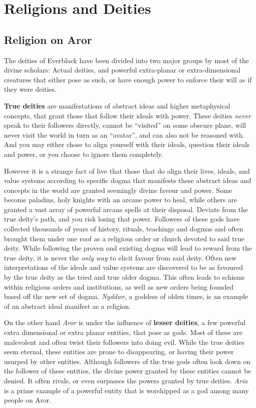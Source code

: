 \chapter{Religions and Deities}

\section{Religion on Aror}
\label{sec:Religion}

The deities of Everblack have been divided into two major groups by most of
the divine scholars: Actual deities, and powerful extra-planar or
extra-dimensional creatures that either pose as such, or have enough power to
enforce their will as if they were deities.

\textbf{True deities} are manifestations of abstract ideas and higher
metaphysical concepts, that grant those that follow their ideals with
power. These deities \emph{never} speak to their followers directly, cannot be
``visited'' on some obscure plane, will never visit the world in turn as an
``avatar'', and can also not be reasoned with. And you may either chose to
align yourself with their ideals, question their ideals and power, or you
choose to ignore them completely.

However it is a strange fact of live that those that do align their lives,
ideals, and value systems according to specific dogma that manifests these
abstract ideas and concepts in the world are granted seemingly divine favour
and power. Some become paladins, holy knights with an arcane power to heal,
while others are granted a vast array of powerful arcane spells at their
disposal. Deviate from the true deity's path, and you risk losing that
power. Followers of these gods have collected thousands of years of history,
rituals, teachings and dogmas and often brought them under one roof as a
religious order or church devoted to said true deity. While following the
proven and existing dogma will lead to reward from the true deity, it is never
the \emph{only way} to elicit favour from said deity. Often new
interpretations of the ideals and value systems are discovered to be as
favoured by the true deity as the tried and true older dogma. This often leads
to schisms within religious orders and institutions, as well as new orders
being founded based off the new set of dogma. \emph{Nyddwr}, a goddess of
olden times, is an example of an abstract ideal manifest as a religion.

On the other hand \emph{Aror} is under the influence of \textbf{lesser
  deities}, a few powerful extra dimensional or extra planar entities, that
pose as gods. Most of these are malevolent and often twist their followers
into doing evil. While the true deities seem eternal, these entities are prone
to disappearing, or having their power usurped by other entities. Although
followers of the true gods often look down on the follower of these entities,
the divine power granted by these entities cannot be denied. It often rivals,
or even surpasses the powers granted by true deities. \emph{Aria} is a prime
example of a powerful entity that is worshipped as a god among many people on
Aror.


